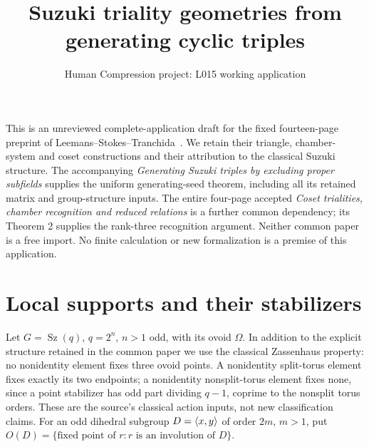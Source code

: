 \documentclass[11pt,a4paper]{article}
\title{Suzuki triality geometries from generating cyclic triples}
\author{Human Compression project: L015 working application}\date{}
\newcommand{\Sz}{\operatorname{Sz}}\newcommand{\Aut}{\operatorname{Aut}}
\begin{document}
\maketitle
This is an unreviewed complete-application draft for the fixed fourteen-page
preprint of Leemans--Stokes--Tranchida~\cite{LST}. We retain their triangle,
chamber-system and coset constructions and their attribution to the classical
Suzuki structure. The accompanying \emph{Generating Suzuki triples by
excluding proper subfields} supplies the uniform generating-seed theorem,
including all its retained matrix and group-structure inputs. The entire
four-page accepted \emph{Coset trialities, chamber recognition and reduced
relations} is a further common dependency; its Theorem 2 supplies the
rank-three recognition argument. Neither common paper is a free import.
No finite calculation or new formalization is a premise of this application.

\section{Local supports and their stabilizers}
Let $G=\Sz(q)$, $q=2^n$, $n>1$ odd, with its ovoid $\Omega$.
In addition to the explicit structure retained in the common paper we use
the classical Zassenhaus property: no nonidentity element fixes three ovoid
points. A nonidentity split-torus element fixes exactly its two endpoints;
a nonidentity nonsplit-torus element fixes none, since a point stabilizer
has odd part dividing $q-1$, coprime to the nonsplit torus orders.
These are the source's classical action inputs, not new classification claims.
For an odd dihedral subgroup $D=\langle x,y\rangle$ of order $2m$, $m>1$, put
$O(D)=\{\text{fixed point of }r:r\text{ is an involution of }D\}$.
\end{document}

